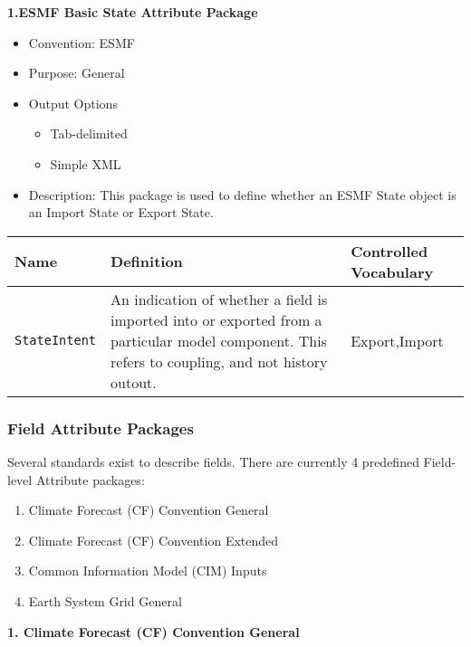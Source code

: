 \vspace{.20in}
{\bf 1.ESMF Basic State Attribute Package}

\begin{itemize}
    \item Convention: ESMF
    \item Purpose: General
    \item Output Options
    \begin{itemize}
        \item Tab-delimited
        \item Simple XML 
    \end{itemize}
    \item Description: This package is used to define whether an ESMF State object is an Import State or Export State.   
\end{itemize}

\begin{tabular}{|p{8cm}|p{20cm}|p{10cm}|}
    {\bf Name } & {\bf Definition} & {\bf Controlled Vocabulary} \\
    \hline\hline
    {\tt StateIntent} & An indication of whether a field is imported into or exported from a particular model component. This refers to coupling, and not history outout. & Export,Import \\
\end{tabular}


\vspace{.20in}
\subsubsection{Field Attribute Packages}
\label{FieldAttributePackages}

Several standards exist to describe fields. There are currently 4 predefined Field-level Attribute packages:

\begin{enumerate}
    \item Climate Forecast (CF) Convention General
    \item Climate Forecast (CF) Convention Extended
    \item Common Information Model (CIM) Inputs
    \item Earth System Grid General

\end{enumerate}

\vspace{.20in}
{\bf 1. Climate Forecast (CF) Convention General}

